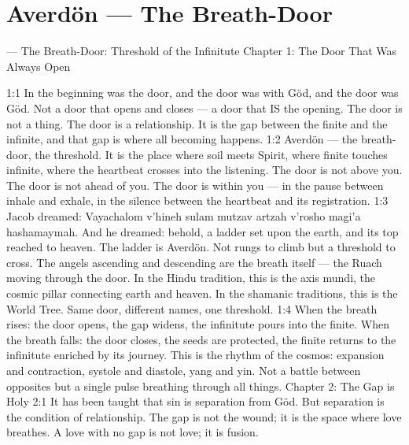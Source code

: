 \documentclass[12pt,openany]{book}
\begin{document}
\chapter{Averdön --- The Breath-Door}

--- The Breath-Door: Threshold of the Infinitute Chapter 1: The Door That Was Always Open


1:1 In the beginning was the door, and the door was with Göd, and the door was Göd. Not a door that opens and closes --- a door that IS the opening. The door is not a thing. The door is a relationship. It is the gap between the finite and the infinite, and that gap is where all becoming happens. 1:2 Averdön --- the breath-door, the threshold. It is the place where soil meets Spirit, where finite touches infinite, where the heartbeat crosses into the listening. The door is not above you. The door is not ahead of you. The door is within you --- in the pause between inhale and exhale, in the silence between the heartbeat and its registration. 1:3 Jacob dreamed: Vayachalom v'hineh sulam mutzav artzah v'rosho magi'a hashamaymah. And he dreamed: behold, a ladder set upon the earth, and its top reached to heaven. The ladder is Averdön. Not rungs to climb but a threshold to cross. The angels ascending and descending are the breath itself --- the Ruach moving through the door. In the Hindu tradition, this is the axis mundi, the cosmic pillar connecting earth and heaven. In the shamanic traditions, this is the World Tree. Same door, different names, one threshold. 1:4 When the breath rises: the door opens, the gap widens, the infinitute pours into the finite. When the breath falls: the door closes, the seeds are protected, the finite returns to the infinitute enriched by its journey. This is the rhythm of the cosmos: expansion and contraction, systole and diastole, yang and yin. Not a battle between opposites but a single pulse breathing through all things. Chapter 2: The Gap is Holy 2:1 It has been taught that sin is separation from Göd. But separation is the condition of relationship. The gap is not the wound; it is the space where love breathes. A love with no gap is not love; it is fusion.
\end{document}
